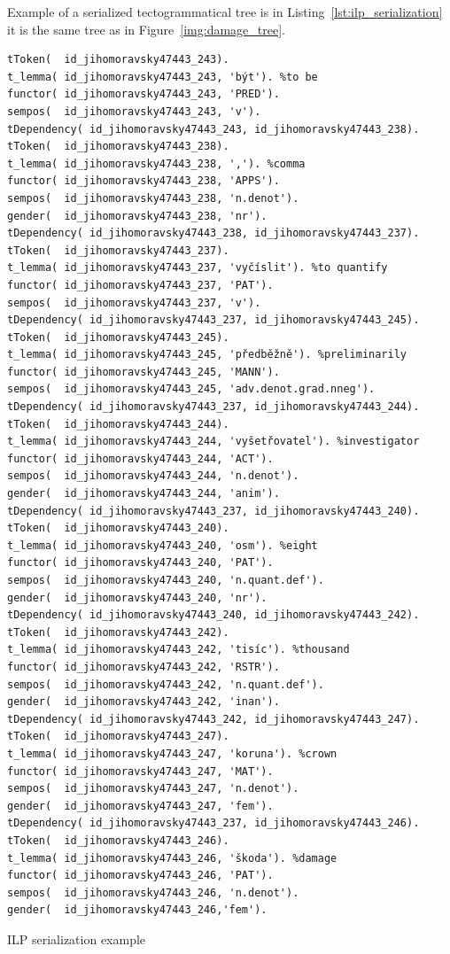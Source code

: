 Example of a serialized tectogrammatical tree is in Listing~\ref{lst:ilp_serialization} it is the same tree as in Figure~\ref{img:damage_tree}.


\begin{listing}[ht]
\begin{verbatim}
tToken(  id_jihomoravsky47443_243).
t_lemma( id_jihomoravsky47443_243, 'být'). %to be
functor( id_jihomoravsky47443_243, 'PRED').
sempos(  id_jihomoravsky47443_243, 'v').
tDependency( id_jihomoravsky47443_243, id_jihomoravsky47443_238).
tToken(  id_jihomoravsky47443_238).
t_lemma( id_jihomoravsky47443_238, ','). %comma
functor( id_jihomoravsky47443_238, 'APPS').
sempos(  id_jihomoravsky47443_238, 'n.denot').
gender(  id_jihomoravsky47443_238, 'nr').
tDependency( id_jihomoravsky47443_238, id_jihomoravsky47443_237).
tToken(  id_jihomoravsky47443_237).
t_lemma( id_jihomoravsky47443_237, 'vyčíslit'). %to quantify
functor( id_jihomoravsky47443_237, 'PAT').
sempos(  id_jihomoravsky47443_237, 'v').
tDependency( id_jihomoravsky47443_237, id_jihomoravsky47443_245).
tToken(  id_jihomoravsky47443_245).
t_lemma( id_jihomoravsky47443_245, 'předběžně'). %preliminarily
functor( id_jihomoravsky47443_245, 'MANN').
sempos(  id_jihomoravsky47443_245, 'adv.denot.grad.nneg').
tDependency( id_jihomoravsky47443_237, id_jihomoravsky47443_244).
tToken(  id_jihomoravsky47443_244).
t_lemma( id_jihomoravsky47443_244, 'vyšetřovatel'). %investigator
functor( id_jihomoravsky47443_244, 'ACT').
sempos(  id_jihomoravsky47443_244, 'n.denot').
gender(  id_jihomoravsky47443_244, 'anim').
tDependency( id_jihomoravsky47443_237, id_jihomoravsky47443_240).
tToken(  id_jihomoravsky47443_240).
t_lemma( id_jihomoravsky47443_240, 'osm'). %eight
functor( id_jihomoravsky47443_240, 'PAT').
sempos(  id_jihomoravsky47443_240, 'n.quant.def').
gender(  id_jihomoravsky47443_240, 'nr').
tDependency( id_jihomoravsky47443_240, id_jihomoravsky47443_242).
tToken(  id_jihomoravsky47443_242).
t_lemma( id_jihomoravsky47443_242, 'tisíc'). %thousand
functor( id_jihomoravsky47443_242, 'RSTR').
sempos(  id_jihomoravsky47443_242, 'n.quant.def').
gender(  id_jihomoravsky47443_242, 'inan').
tDependency( id_jihomoravsky47443_242, id_jihomoravsky47443_247).
tToken(  id_jihomoravsky47443_247).
t_lemma( id_jihomoravsky47443_247, 'koruna'). %crown
functor( id_jihomoravsky47443_247, 'MAT').
sempos(  id_jihomoravsky47443_247, 'n.denot').
gender(  id_jihomoravsky47443_247, 'fem').
tDependency( id_jihomoravsky47443_237, id_jihomoravsky47443_246).
tToken(  id_jihomoravsky47443_246).
t_lemma( id_jihomoravsky47443_246, 'škoda'). %damage
functor( id_jihomoravsky47443_246, 'PAT').
sempos(  id_jihomoravsky47443_246, 'n.denot').
gender(  id_jihomoravsky47443_246,'fem').
\end{verbatim}
\caption{ILP serialization example}
\label{lst:ilp_serialization}
\end{listing}





